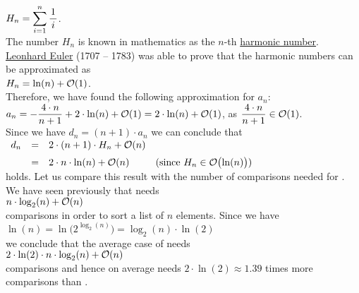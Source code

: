 \\[0.2cm]
\hspace*{1.3cm}
$H_n = \displaystyle\sum\limits_{i=1}^{n}\frac{1}{\,i\,}$.
\\[0.2cm] 
The number $H_n$ is known in mathematics as the $n$-th 
\href{http://en.wikipedia.org/wiki/Harmonic_number}{harmonic number}.
\href{http://en.wikipedia.org/wiki/Leonhard_Euler}{Leonhard Euler} (1707 -- 1783) 
was able to prove that the harmonic numbers can be approximated as
\\[0.2cm]
\hspace*{1.3cm}
$\displaystyle H_n = \ln(n) + \mathcal{O}(1)$. 
\\[0.2cm] 
Therefore, we have found the following approximation for $a_n$:
\\[0.2cm]
\hspace*{1.3cm}
$\displaystyle a_n = - \frac{4 \cdot n}{n+1}  + 2 \cdot \ln(n) + \mathcal{O}(1) =  2 \cdot \ln(n) + \mathcal{O}(1)$,
\quad as \quad $\displaystyle \frac{4 \cdot n}{n+1} \in \mathcal{O}(1)$.
\\[0.2cm]
Since we have $d_n = (n+1) \cdot a_{n}$ we can conclude that
\\[0.2cm]
\hspace*{1.3cm}
$\begin{array}{lclr}
 d_n & = &  2 \cdot(n+1) \cdot H_n + \mathcal{O}(n) \\[0.2cm]
     & = & 2 \cdot n \cdot \ln(n) + \mathcal{O}(n) & \mbox{(since $H_n \in \mathcal{O}\bigl(\ln(n)\bigr)$)}
 \end{array}
$
\\[0.2cm]
holds.  Let us compare this result with the number of comparisons needed for .
We have seen previously that  needs
\\[0.2cm]
\hspace*{1.3cm} $n \cdot \log_2(n) + \mathcal{O}(n)$ \\[0.2cm]
comparisons in order to sort a list of $n$ elements.  Since we have
\\[0.2cm]
\hspace*{1.3cm}
$\ln(n) = \ln\bigl(2^{\log_2(n)}\bigr) =  \log_2(n) \cdot \ln(2)$
\\[0.2cm]
we conclude that the average case of  needs
 \\[0.2cm]
\hspace*{1.3cm} $2 \cdot \ln(2) \cdot n \cdot \log_2(n) + \mathcal{O}(n)$ \\[0.2cm]
comparisons and hence on average  needs  $2 \cdot \ln(2) \approx 1.39$ times more comparisons than
.  



